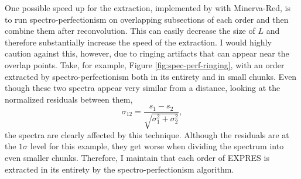 One possible speed up for the extraction, implemented by \citet{cornachione_full_2019} with Minerva-Red, is to run spectro-perfectionism on overlapping subsections of each order and then combine them after reconvolution. This can easily decrease the size of $L$ and therefore substantially increase the speed of the extraction. I would highly caution against this, however, due to ringing artifacts that can appear near the overlap points. Take, for example, Figure \ref{fig:spec-perf-ringing}, with an order extracted by spectro-perfectionism both in its entirety and in small chunks. Even though these two spectra appear very similar from a distance, looking at the normalized residuals between them,
\begin{equation}
    \sigma_{12} = \frac{s_1 - s_2}{\sqrt{\sigma_1^2 + \sigma_2^2}},
    \label{eq:residual}
\end{equation}
the spectra are clearly affected by this technique. Although the residuals are at the $1\sigma$ level for this example, they get worse when dividing the spectrum into even smaller chunks. Therefore, I maintain that each order of EXPRES is extracted in its entirety by the spectro-perfectionism algorithm.

